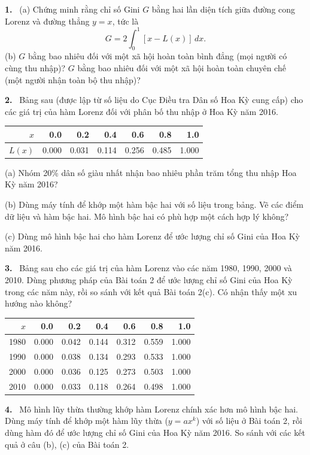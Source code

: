 \documentclass[12pt,a4paper]{article}
\newcommand{\bt}[1]{\par\smallskip\Needspace{5\baselineskip}\noindent\textbf{#1.}\ }
\newcommand{\prj}[1]{\bt{#1}}
\begin{document}
\prj{1} (a) Chứng minh rằng chỉ số Gini $G$ bằng hai lần diện tích giữa đường cong Lorenz và đường thẳng $y=x$, tức là
\[G=2\int_0^1[x-L(x)]\,dx.\]
\noindent(b) $G$ bằng bao nhiêu đối với một xã hội hoàn toàn bình đẳng (mọi người có cùng thu nhập)? $G$ bằng bao nhiêu đối với một xã hội hoàn toàn chuyên chế (một người nhận toàn bộ thu nhập)?
\prj{2} Bảng sau (được lập từ số liệu do Cục Điều tra Dân số Hoa Kỳ cung cấp) cho các giá trị của hàm Lorenz đối với phân bố thu nhập ở Hoa Kỳ năm 2016.
\begin{center}\begin{tabular}{rrrrrrr}\toprule
$x$&0.0&0.2&0.4&0.6&0.8&1.0\\\midrule
$L(x)$&0.000&0.031&0.114&0.256&0.485&1.000\\\bottomrule
\end{tabular}\end{center}
\noindent(a) Nhóm 20\% dân số giàu nhất nhận bao nhiêu phần trăm tổng thu nhập Hoa Kỳ năm 2016?
\par\noindent(b) Dùng máy tính để khớp một hàm bậc hai với số liệu trong bảng. Vẽ các điểm dữ liệu và hàm bậc hai. Mô hình bậc hai có phù hợp một cách hợp lý không?
\par\noindent(c) Dùng mô hình bậc hai cho hàm Lorenz để ước lượng chỉ số Gini của Hoa Kỳ năm 2016.
\prj{3} Bảng sau cho các giá trị của hàm Lorenz vào các năm 1980, 1990, 2000 và 2010. Dùng phương pháp của Bài toán 2 để ước lượng chỉ số Gini của Hoa Kỳ trong các năm này, rồi so sánh với kết quả Bài toán 2(c). Có nhận thấy một xu hướng nào không?
\begin{center}\begin{tabular}{rrrrrrr}\toprule
$x$&0.0&0.2&0.4&0.6&0.8&1.0\\\midrule
1980&0.000&0.042&0.144&0.312&0.559&1.000\\
1990&0.000&0.038&0.134&0.293&0.533&1.000\\
2000&0.000&0.036&0.125&0.273&0.503&1.000\\
2010&0.000&0.033&0.118&0.264&0.498&1.000\\\bottomrule
\end{tabular}\end{center}
\prj{4} Mô hình lũy thừa thường khớp hàm Lorenz chính xác hơn mô hình bậc hai. Dùng máy tính để khớp một hàm lũy thừa ($y=ax^k$) với số liệu ở Bài toán 2, rồi dùng hàm đó để ước lượng chỉ số Gini của Hoa Kỳ năm 2016. So sánh với các kết quả ở câu (b), (c) của Bài toán 2.
\end{document}
